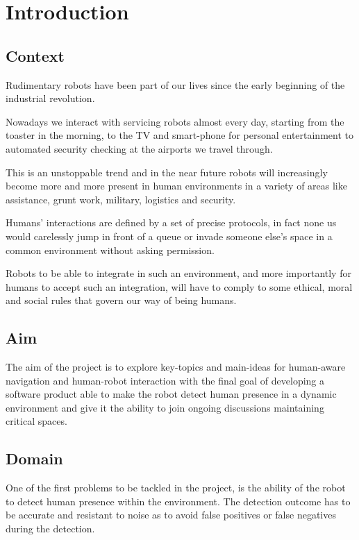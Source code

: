 \chapter{Introduction}
\label{chapter1}

\section{Context}

Rudimentary robots have been part of our lives since the early beginning of the industrial revolution. 

Nowadays we interact with servicing robots almost every day, starting from the toaster in the morning, to the TV and smart-phone for personal entertainment to automated security checking at the airports we travel through. 

This is an unstoppable trend and in the near future robots will increasingly become more and more present in human environments in a variety of areas like assistance, grunt work, military, logistics and security.

Humans' interactions are defined by a set of precise protocols, in fact none us would carelessly jump in front of a queue or invade someone else's space in a common environment without asking permission.

Robots to be able to integrate in such an environment, and more importantly for humans to accept such an integration, will have to comply to some ethical, moral and social rules that govern our way of being humans.

\section{Aim}

The aim of the project is to explore key-topics and main-ideas for human-aware navigation and human-robot interaction with the final goal of developing a software product able to make the robot detect human presence in a dynamic environment and give it the ability to join ongoing discussions maintaining critical spaces.

\section{Domain}

One of the first problems to be tackled in the project, is the ability of the robot to detect human presence within the environment. The detection outcome has to be accurate and resistant to noise as to avoid false positives or false negatives during the detection. 

